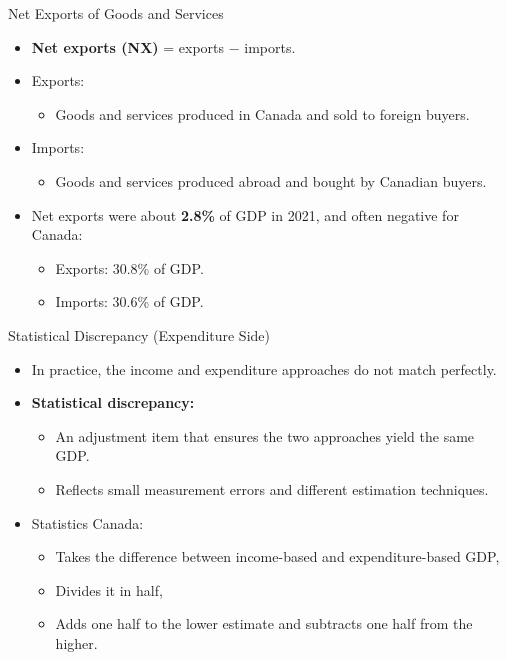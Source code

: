 \documentclass[aspectratio=169]{beamer}
\begin{document}
\begin{frame}{Net Exports of Goods and Services}
\transfade
\begin{itemize}
  \item \textbf{Net exports (NX)} = exports \(-\) imports.
  \item Exports:
  \begin{itemize}
    \item Goods and services produced in Canada and sold to foreign buyers.
  \end{itemize}
  \item Imports:
  \begin{itemize}
    \item Goods and services produced abroad and bought by Canadian buyers.
  \end{itemize}
  \item Net exports were about \textbf{2.8\%} of GDP in 2021, and often \alert{negative} for Canada:
  \begin{itemize}
    \item Exports: 30.8\% of GDP.
    \item Imports: 30.6\% of GDP.
  \end{itemize}
\end{itemize}
\end{frame}

\begin{frame}{Statistical Discrepancy (Expenditure Side)}
\transfade
\begin{itemize}
  \item In practice, the income and expenditure approaches do not match perfectly.
  \item \textbf{Statistical discrepancy:}
  \begin{itemize}
    \item An adjustment item that ensures the two approaches yield the same GDP.
    \item Reflects small measurement errors and different estimation techniques.
  \end{itemize}
  \item Statistics Canada:
  \begin{itemize}
    \item Takes the difference between income-based and expenditure-based GDP,
    \item Divides it in half,
    \item Adds one half to the lower estimate and subtracts one half from the higher.
  \end{itemize}
\end{itemize}
\end{frame}
\end{document}
